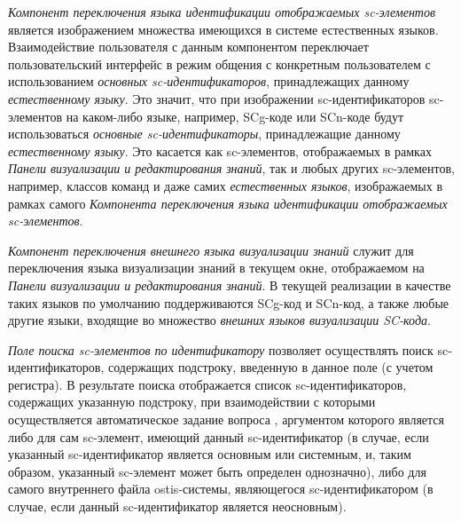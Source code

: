 \begin{scnitemize}
\begin{scnitemize}
\textit{Компонент переключения языка идентификации отображаемых sc-элементов} является изображением множества
имеющихся в системе естественных языков. Взаимодействие пользователя с данным компонентом переключает
пользовательский интерфейс в режим общения с конкретным пользователем с использованием \textit{основных sc-идентификаторов},
принадлежащих данному \textit{естественному языку}. Это значит, что при изображении sc-идентификаторов sc-элементов
на каком-либо языке, например, SCg-коде или SCn-коде будут использоваться \textit{основные sc-идентификаторы},
принадлежащие данному \textit{естественному языку}. Это касается как sc-элементов, отображаемых в рамках
\textit{Панели визуализации и редактирования знаний}, так и любых других sc-элементов, например, классов команд и
даже самих \textit{естественных языков}, изображаемых в рамках самого \textit{Компонента переключения языка идентификации
отображаемых sc-элементов}.

\textit{Компонент переключения внешнего языка визуализации знаний} служит для переключения языка визуализации знаний в
текущем окне, отображаемом на \textit{Панели визуализации и редактирования знаний}. В текущей реализации в качестве
таких языков по умолчанию поддерживаются SCg-код и SCn-код, а также любые другие языки, входящие во множество
\textit{внешних языков визуализации SC-кода}.

\textit{Поле поиска sc-элементов по идентификатору} позволяет осуществлять поиск \mbox{sc-идентификаторов}, содержащих
подстроку, введенную в данное поле (с учетом регистра). В результате поиска отображается список sc-идентификаторов,
содержащих указанную подстроку, при взаимодействии с которыми осуществляется автоматическое задание вопроса
, аргументом которого является либо для сам sc-элемент, имеющий данный sc-идентификатор (в случае,
если указанный sc-идентификатор является основным или системным, и, таким образом, указанный sc-элемент может быть
определен однозначно), либо для самого внутреннего файла ostis-системы, являющегося sc-идентификатором (в случае, если
данный sc-идентификатор является неосновным).


\end{scnitemize}
\end{scnitemize}

